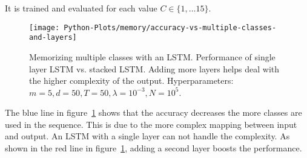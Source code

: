 		It is trained and evaluated for each value $C \in \{1, \dots 15\}$.
		\begin{figure}[tb]
			\centering
			\texttt{[image: Python-Plots/memory/accuracy-vs-multiple-classes-and-layers]}
			\caption[Memorizing the past with the LSTM: Multiple classes]
					{Memorizing multiple classes with an LSTM.
					 Performance of single layer LSTM vs. stacked LSTM.
					 Adding more layers helps deal with the higher complexity of the output.
					 Hyperparameters: $m = 5, d = 50, T = 50, \lambda = 10^{-3}, N = 10^5$.
					 \label{fig:accuracy-vs-multiple-classes-and-layers}}
			
		\end{figure}
		The blue line in figure~\ref{fig:accuracy-vs-multiple-classes-and-layers} shows that the accuracy decreases the more classes are used in the sequence.
		This is due to the more complex mapping between input and output. 
		An LSTM with a single layer can not handle the complexity.
		As shown in the red line in figure~\ref{fig:accuracy-vs-multiple-classes-and-layers}, adding a second layer boosts the performance.
		
		
		
